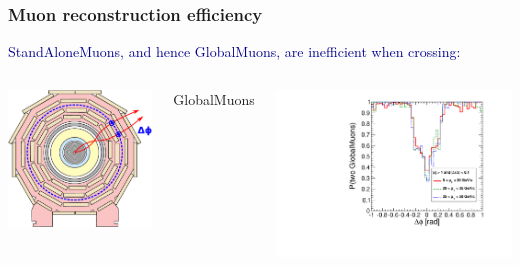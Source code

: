 \documentclass[compress]{beamer}
\begin{document}
\begin{frame}
\frametitle{Muon reconstruction efficiency}

\vspace{0.15 cm}
\textcolor{darkblue}{StandAloneMuons, and hence GlobalMuons, are inefficient when crossing:}

\vspace{0.15 cm}
\begin{columns}
\includegraphics[width=\linewidth]{muoneverything.pdf}

\centering GlobalMuons

\includegraphics[width=\linewidth]{endcap_dphi_bypt_twoGlobalMuons.pdf}


\end{columns}
\end{frame}
\end{document}
